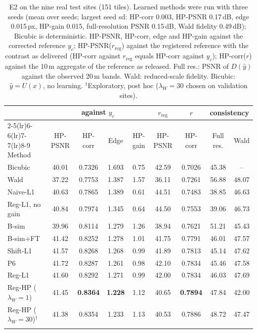 \documentclass[pdflatex,sn-basic,referee,lineno]{sn-jnl}
\newcommand{\rreg}{r_{\mathrm{reg}}}
\begin{document}
\begin{table}[t]
\caption{E2 on the nine real test sites (151 tiles). Learned methods were run with three seeds (mean over seeds;
largest seed sd: HP-corr 0.003, HP-PSNR 0.17\,dB, edge 0.015\,px, HP-gain 0.015, full-resolution PSNR 0.15\,dB, Wald
fidelity 0.49\,dB); Bicubic is deterministic. HP-PSNR, HP-corr, edge and HP-gain
against the corrected reference $y_c$; HP-PSNR($\rreg$) against the registered reference with the contrast as
delivered (HP-corr against $\rreg$ equals HP-corr against $y_c$); HP-corr($r$) against the 10\,m aggregate of the
reference as released. Full res.: PSNR of $D(\hat y)$ against the observed 20\,m bands. Wald: reduced-scale fidelity.
Bicubic: $\hat y=U(x)$, no learning. $^\dagger$Exploratory, post hoc ($\lambda_W=30$ chosen on validation sites).}\label{tab:e2}
\footnotesize\setlength{\tabcolsep}{2.5pt}
\begin{tabular*}{\textwidth}{@{\extracolsep\fill}lcccccccc}
\toprule
 & \multicolumn{4}{c}{against $y_c$} & $\rreg$ & $r$ & \multicolumn{2}{c}{consistency} \\
\cmidrule(lr){2-5}\cmidrule(lr){6-6}\cmidrule(lr){7-7}\cmidrule(lr){8-9}
Method & HP-PSNR & HP-corr & Edge & HP-gain & HP-PSNR & HP-corr & Full res. & Wald \\
\midrule
Bicubic & 40.01 & 0.7326 & 1.693 & 0.75 & 42.59 & 0.7026 & 45.38 & -- \\
Wald & 37.22 & 0.7753 & 1.387 & 1.57 & 36.11 & 0.7261 & 56.88 & 48.07 \\
Naive-L1 & 40.63 & 0.7865 & 1.389 & 0.61 & 44.51 & 0.7483 & 38.85 & 46.63 \\
Reg-L1, no gain & 40.84 & 0.7974 & 1.345 & 0.64 & 44.50 & 0.7553 & 39.06 & 46.73 \\
B-sim & 39.96 & 0.8114 & 1.279 & 1.26 & 38.94 & 0.7621 & 51.21 & 45.43 \\
B-sim+FT & 41.42 & 0.8252 & 1.278 & 1.01 & 41.75 & 0.7791 & 46.01 & 47.57 \\
Shift-L1 & 41.57 & 0.8268 & 1.268 & 0.99 & 41.89 & 0.7813 & 45.14 & 47.62 \\
P6 & 41.72 & 0.8287 & 1.261 & 0.98 & 42.10 & 0.7834 & 45.46 & 47.58 \\
Reg-L1 & 41.60 & 0.8292 & 1.271 & 0.99 & 42.00 & 0.7834 & 46.03 & 47.69 \\
Reg-HP ($\lambda_W=1$) & 41.45 & \textbf{0.8364} & \textbf{1.228} & 1.12 & 40.65 & \textbf{0.7894} & 47.84 & 42.00 \\
\midrule
Reg-HP ($\lambda_W=30$)$^\dagger$ & 41.38 & 0.8354 & 1.233 & 1.13 & 40.53 & 0.7886 & 48.72 & 47.47 \\
\botrule
\end{tabular*}
\end{table}
\end{document}
